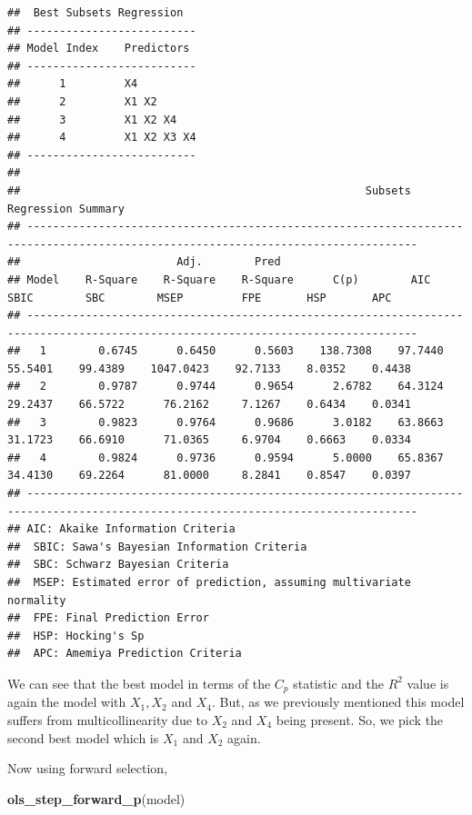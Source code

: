 \documentclass[
  11pt,
]{article}
\newenvironment{Shaded}{\begin{snugshade}}{\end{snugshade}}
\newcommand{\FunctionTok}[1]{\textcolor[rgb]{0.13,0.29,0.53}{\textbf{#1}}}
\newcommand{\NormalTok}[1]{#1}
\begin{document}
\begin{verbatim}
##  Best Subsets Regression  
## --------------------------
## Model Index    Predictors
## --------------------------
##      1         X4          
##      2         X1 X2       
##      3         X1 X2 X4    
##      4         X1 X2 X3 X4 
## --------------------------
## 
##                                                     Subsets Regression Summary                                                    
## ----------------------------------------------------------------------------------------------------------------------------------
##                        Adj.        Pred                                                                                            
## Model    R-Square    R-Square    R-Square      C(p)        AIC       SBIC        SBC        MSEP         FPE       HSP       APC  
## ----------------------------------------------------------------------------------------------------------------------------------
##   1        0.6745      0.6450      0.5603    138.7308    97.7440    55.5401    99.4389    1047.0423    92.7133    8.0352    0.4438 
##   2        0.9787      0.9744      0.9654      2.6782    64.3124    29.2437    66.5722      76.2162     7.1267    0.6434    0.0341 
##   3        0.9823      0.9764      0.9686      3.0182    63.8663    31.1723    66.6910      71.0365     6.9704    0.6663    0.0334 
##   4        0.9824      0.9736      0.9594      5.0000    65.8367    34.4130    69.2264      81.0000     8.2841    0.8547    0.0397 
## ----------------------------------------------------------------------------------------------------------------------------------
## AIC: Akaike Information Criteria 
##  SBIC: Sawa's Bayesian Information Criteria 
##  SBC: Schwarz Bayesian Criteria 
##  MSEP: Estimated error of prediction, assuming multivariate normality 
##  FPE: Final Prediction Error 
##  HSP: Hocking's Sp 
##  APC: Amemiya Prediction Criteria
\end{verbatim}

We can see that the best model in terms of the \(C_p\) statistic and the
\(R^2\) value is again the model with \(X_1, X_2\) and \(X_4\). But, as
we previously mentioned this model suffers from multicollinearity due to
\(X_2\) and \(X_4\) being present. So, we pick the second best model
which is \(X_1\) and \(X_2\) again.

Now using forward selection,

\begin{Shaded}
\begin{Highlighting}[]
\FunctionTok{ols\_step\_forward\_p}\NormalTok{(model)}
\end{Highlighting}
\end{Shaded}
\end{document}
